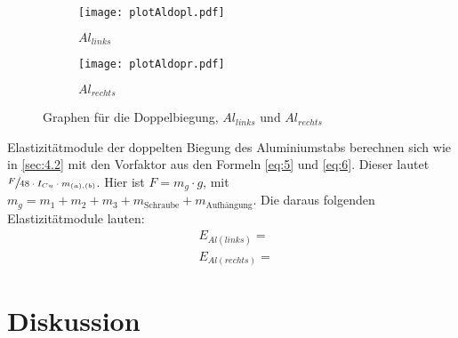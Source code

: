 \begin{figure}[H]
\begin{subfigure}{0.495\linewidth}
    \centering
    \texttt{[image: plotAldopl.pdf]}
    \caption{$Al_{links}$\label{fig:4a}}
\end{subfigure}
\begin{subfigure}{0.495\linewidth}
    \centering
    \texttt{[image: plotAldopr.pdf]}
    \caption{$Al_{rechts}$\label{fig:4b}}    
\end{subfigure}
\caption{Graphen für die Doppelbiegung, $Al_{links}$ und $Al_{rechts}$\label{fig:4}}
\end{figure}

\justifying Elastizitätmodule der doppelten Biegung des Aluminiumstabs berechnen sich wie in \ref{sec:4.2} mit den Vorfaktor
aus den Formeln \eqref{eq:5} und \eqref{eq:6}. Dieser lautet $\sfrac{F}{48 \cdot I_{Cu} \cdot m_{(a),(b)}}$. Hier ist $F = m_g\cdot g$, mit 
$m_g = m_1 + m_2 + m_3 + m_{\text{Schraube}} + m_{\text{Aufhängung}}$. Die daraus folgenden Elastizitätmodule lauten:
\begin{align}
    &E_{Al(links)} = \text{} \label{eq:28}\\
    &E_{Al(rechts)} = \text{} \label{eq:28}
\end{align}


\section{Diskussion}\justifying

\newpage

\printbibliography
